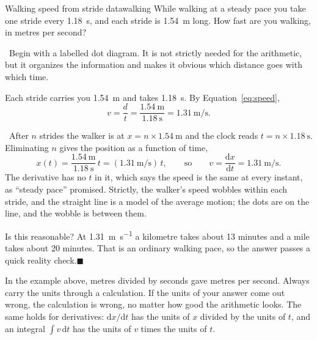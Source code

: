 \documentclass[11pt,twoside,openany]{book}
\newcommand{\dd}{\mathrm{d}}
\newcommand{\deriv}[2]{\frac{\dd #1}{\dd #2}}
\newcounter{check}[chapter]
\newcommand{\viewtag}[3]{\fcolorbox{#2}{#3}{\footnotesize\textbf{\textcolor{#2}{#1}}}}
\newcommand{\elemtag}{\viewtag{Elementary}{elemcol}{elempale}}
\newcommand{\calctag}{\viewtag{Calculus}{calccol}{calcpale}}
\newcommand{\elem}{\par\medskip\noindent\elemtag\ }
\newcommand{\calc}{\par\medskip\noindent\calctag\ }
\newcommand{\qed}{\hfill$\blacksquare$}
\begin{document}
\begin{example}{Walking speed from stride data}{walking}
While walking at a steady pace you take one stride every \SI{1.18}{\second}, and each stride is \SI{1.54}{\metre} long. How fast are you walking, in metres per second?

\elem Begin with a labelled dot diagram. It is not strictly needed for the arithmetic, but it organizes the information and makes it obvious which distance goes with which time.

\begin{center}
\end{center}

Each stride carries you \SI{1.54}{\metre} and takes \SI{1.18}{\second}. By Equation~\eqref{eq:speed},
\[
v = \frac{d}{t} = \frac{\SI{1.54}{\metre}}{\SI{1.18}{\second}} = \SI{1.31}{\metre\per\second}.
\]

\calc After $n$ strides the walker is at $x = n\times\SI{1.54}{\metre}$ and the clock reads $t = n\times\SI{1.18}{\second}$. Eliminating $n$ gives the position as a function of time,
\[
x(t) = \frac{\SI{1.54}{\metre}}{\SI{1.18}{\second}}\,t = (\SI{1.31}{\metre\per\second})\,t,
\qquad\text{so}\qquad
v = \deriv{x}{t} = \SI{1.31}{\metre\per\second}.
\]
The derivative has no $t$ in it, which says the speed is the same at every instant, as ``steady pace'' promised. Strictly, the walker's speed wobbles within each stride, and the straight line is a model of the average motion; the dots are on the line, and the wobble is between them.

\smallskip\noindent Is this reasonable? At \SI{1.31}{\metre\per\second} a kilometre takes about \num{13} minutes and a mile takes about \num{20} minutes. That is an ordinary walking pace, so the answer passes a quick reality check.\qed
\end{example}

\begin{keyidea}
In the example above, metres divided by seconds gave metres per second. Always carry the units through a calculation. If the units of your answer come out wrong, the calculation is wrong, no matter how good the arithmetic looks. The same holds for derivatives: $\dd x/\dd t$ has the units of $x$ divided by the units of $t$, and an integral $\int v\,\dd t$ has the units of $v$ times the units of $t$.
\end{keyidea}
\end{document}
